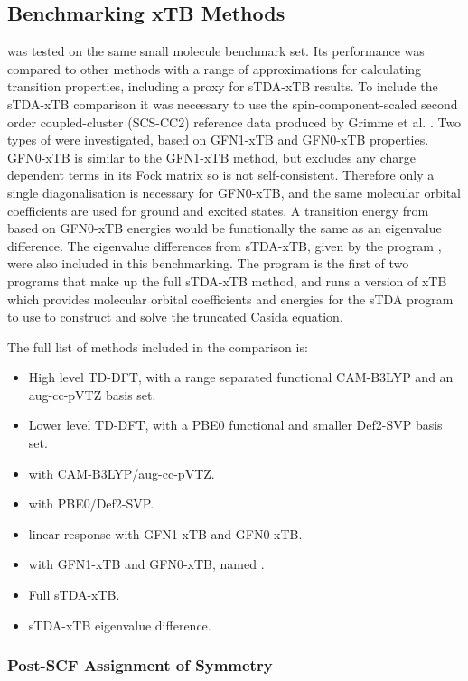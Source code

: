 \afterpartskip
\subsection{Benchmarking xTB \dscf Methods}
\label{subsec:dscf_gfn_tests}
\dxtb was tested on the same small molecule benchmark set. Its performance was compared
to other methods with a range of approximations for calculating transition properties, 
including a proxy for sTDA-xTB results. To include the sTDA-xTB comparison it was
necessary to use the spin-component-scaled second order coupled-cluster (SCS-CC2)
\cite{Hattig2000, Hellweg2008} reference data produced by Grimme et al. \cite{Grimme2016}.
Two types of \dxtb were investigated, based on GFN1-xTB and GFN0-xTB properties.
GFN0-xTB is similar to the GFN1-xTB method, but excludes any charge dependent terms
in its Fock matrix so is not self-consistent. Therefore only a single diagonalisation
is necessary for GFN0-xTB, and the same molecular orbital coefficients are used for
ground and excited states. A transition energy from \dscf based on GFN0-xTB energies
would be functionally the same as an eigenvalue difference.
The eigenvalue differences from sTDA-xTB, given by the  program
\cite{Grimme2016}, were also included in this benchmarking. The  
program is the first of two programs that make up the full sTDA-xTB method, and 
runs a version of xTB which provides molecular orbital coefficients and energies
for the sTDA program to use to construct and solve the truncated Casida equation.

The full list of methods included in the comparison is:
\begin{itemize}
    \item High level TD-DFT, with a range separated functional CAM-B3LYP and
     an aug-cc-pVTZ basis set.
    \item Lower level TD-DFT, with a PBE0 functional and smaller Def2-SVP basis set.
    \item \dscf with CAM-B3LYP/aug-cc-pVTZ.
    \item \dscf with PBE0/Def2-SVP.
    \item linear response with GFN1-xTB and GFN0-xTB.
    \item \dscf with GFN1-xTB and GFN0-xTB, named \dxtb.
    \item Full sTDA-xTB.
    \item sTDA-xTB eigenvalue difference.
\end{itemize}
 
\subsubsection{Post-SCF Assignment of Symmetry}
\label{subsubsec:post_scf_symmetry}

